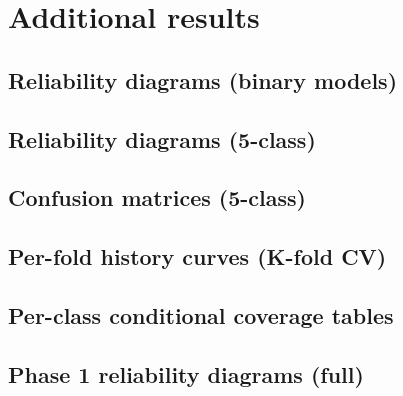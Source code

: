 \chapter{Additional results}
\label{ch:additional}


\section{Reliability diagrams (binary models)}

\section{Reliability diagrams (5-class)}

\section{Confusion matrices (5-class)}

\section{Per-fold history curves (K-fold CV)}

\section{Per-class conditional coverage tables}

\section{Phase 1 reliability diagrams (full)}

